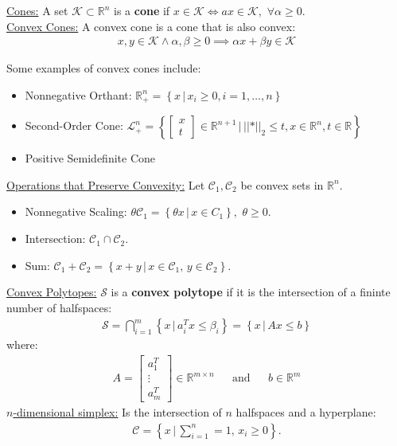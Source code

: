 \documentclass{article}
\newcommand{\norm}[2]{\left\lvert\left\lvert#1\right\rvert\right\rvert}
\newcommand{\sheader}[1]{\underline{#1:}}
\newcommand{\gap}{\medskip\\}
\newcommand{\curly}[1]{\left\{#1\right\}}
\newcommand{\ds}{\displaystyle}
\begin{document}
\sheader{Cones} A set $\mathcal{K} \subset \mathbb{R}^n$ is a 
\textbf{cone} if $x \in \mathcal{K} \iff ax \in \mathcal{K},\,\, \forall \alpha \geq 0$.
\gap 
\sheader{Convex Cones} A convex cone is a cone that is 
also convex:
\begin{align*}
    x, y \in \mathcal{K} \wedge \alpha, \beta \geq 0 \implies \alpha x + \beta y \in \mathcal{K}
\end{align*}

Some examples of convex cones include:
\begin{itemize}
    \item Nonnegative Orthant: $\ds \mathbb{R}^n_+ = \curly{x \,|\, x_i \geq 0, i = 1, \ldots, n}$
    \item Second-Order Cone: $\ds \mathcal{L}_+^n = \curly{\begin{bmatrix}
        x\\t
    \end{bmatrix} \in \mathbb{R}^{n+1} \,\biggr\rvert\, \norm*{x}_2 \leq t, x \in \mathbb{R}^n, t \in \mathbb{R}}$
    \item Positive Semidefinite Cone
\end{itemize}

\sheader{Operations that Preserve Convexity} Let $\mathcal{C}_1, \mathcal{C}_2$ 
be convex sets in $\mathbb{R}^n$.
\begin{itemize}
    \item Nonnegative Scaling: $\theta \mathcal{C}_1 = \curly{\theta x \,|\, x \in C_1}, \,\, \theta \geq 0$.
    \item Intersection: $\mathcal{C}_1 \cap \mathcal{C}_2$.
    \item Sum: $\mathcal{C}_1 + \mathcal{C}_2 = \curly{x + y \,|\, x \in \mathcal{C}_1, \, y \in \mathcal{C}_2}$.
\end{itemize}

\sheader{Convex Polytopes} $\mathcal{S}$ is a \textbf{convex polytope} 
if it is the intersection of a fininte number of halfspaces:
\begin{align*}
    \mathcal{S} = \bigcap\limits_{i=1}^m \curly{x \,|\, a_i^T x \leq \beta_i} = \curly{x \,|\, Ax \leq b}
\end{align*}
where:
\begin{align*}
    A = \begin{bmatrix}
        a_1^T \\ \vdots \\ a_m^T 
    \end{bmatrix} \in \mathbb{R}^{m \times n} && \textrm{and}&& b \in \mathbb{R}^m
\end{align*}
\sheader{$n$-dimensional simplex} Is the intersection of $n$ halfspaces and a 
hyperplane:
\begin{align*}
    \mathcal{C} = \curly{x \,\biggr\rvert\, \sum_{i=1}^{n}= 1, \, x_i \geq 0}.
\end{align*}
\end{document}
